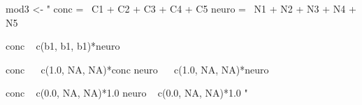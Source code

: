 \begin{Schunk}
\begin{Sinput}
 mod3 <- "
 conc =~ C1 + C2 + C3 + C4 + C5
 neuro =~ N1 + N2 + N3 + N4 + N5
 
 conc ~ c(b1, b1, b1)*neuro
 
 conc ~~ c(1.0, NA, NA)*conc
 neuro ~~ c(1.0, NA, NA)*neuro
 
 conc ~ c(0.0, NA, NA)*1.0
 neuro ~ c(0.0, NA, NA)*1.0
 "
\end{Sinput}
\end{Schunk}
